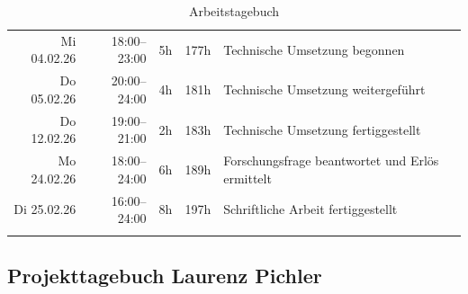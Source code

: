 \begin{longtable}{r | r | r | r | p{}}
	Mi 04.02.26 & 18:00--23:00 & 5h & 177h & Technische Umsetzung begonnen \\
	Do 05.02.26 & 20:00--24:00 & 4h & 181h & Technische Umsetzung weitergeführt \\
	Do 12.02.26 & 19:00--21:00 & 2h & 183h & Technische Umsetzung fertiggestellt \\

	Mo 24.02.26 & 18:00--24:00 & 6h & 189h & Forschungsfrage beantwortet und Erlös ermittelt \\
	Di 25.02.26 & 16:00--24:00 & 8h & 197h & Schriftliche Arbeit fertiggestellt \\

	\caption{Arbeitstagebuch}\label{tab:Arbeitstagebuch}
\end{longtable}
\subsection{Projekttagebuch Laurenz Pichler}

